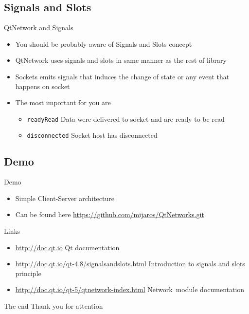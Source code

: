 \documentclass{beamer}
\begin{document}
    \subsection{Signals and Slots}
    \begin{frame}{QtNetwork and Signals}
        \begin{itemize}
            \item You should be probably aware of Signals and Slots concept
            \item QtNetwork uses signals and slots in same manner as the rest of library
            \item Sockets emits signals that induces the change of state or any event that happens on socket
            \item The most important for you are
            \begin{itemize}
                \item \texttt{readyRead} Data were delivered to socket and are ready to be read
                \item \texttt{disconnected} Socket host has disconnected
            \end{itemize}
        \end{itemize}

    \end{frame}
    \subsection{Demo}
    \begin{frame}{Demo}
        \begin{itemize}
            \item Simple Client-Server architecture
            \item Can be found here \url{https://github.com/mijaros/QtNetworks.git}
        \end{itemize}
    \end{frame}
    \begin{frame}{Links}
        \begin{itemize}
            \item \url{http://doc.qt.io} Qt documentation
            \item \url{http://doc.qt.io/qt-4.8/signalsandslots.html} Introduction to signals and slots principle
            \item \url{http://doc.qt.io/qt-5/qtnetwork-index.html} Network~module documentation
        \end{itemize}
    \end{frame}
    \begin{frame}{The end}
        \Large Thank you for attention
    \end{frame}
\end{document}
